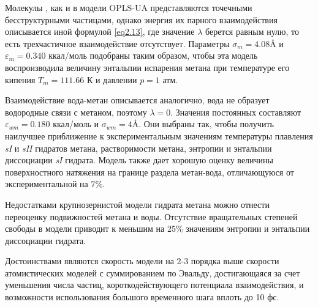 Молекулы , как и в модели OPLS-UA представляются точечными бесструктурными частицами, однако энергия их парного взаимодействия описывается иной формулой \eqref{eq2.13}, где значение $\lambda$ берется равным нулю, то есть трехчастичное взаимодействие отсутствует. Параметры $\sigma_m=4.08 \si{\angstrom}$ и  $\varepsilon_m=0.340$ ккал/моль подобраны таким образом, чтобы эта модель воспроизводила величину энтальпии испарения метана при температуре его кипения $T_m=111.66$ К и давлении $p=1$ атм.

Взаимодействие вода-метан описывается аналогично, вода не образует водородные связи с метаном, поэтому $\lambda=0$. Значения постоянных составляют $\varepsilon_{wm}=0.180$ ккал/моль  и $\sigma_{wm}=4 \si{\angstrom}$. Они выбраны так, чтобы получить наилучшее приближение к экспериментальным значениям температуры плавления \textit{sI} и \textit{sII} гидратов метана, растворимости метана, энтропии и энтальпии диссоциации \textit{sI} гидрата. Модель также дает хорошую оценку величины поверхностного натяжения на границе раздела метан-вода, отличающуюся от экспериментальной на 7\%. 

Недостатками крупнозернистой модели гидрата метана можно отнести переоценку подвижностей метана и воды. Отсутствие вращательных степеней свободы в модели приводит к меньшим на 25\% значениям энтропии и энтальпии диссоциации гидрата. 

Достоинствами являются скорость модели на 2-3 порядка выше скорости атомистических моделей с суммированием по Эвальду, достигающаяся за счет уменьшения числа частиц, короткодействующего потенциала взаимодействия, и возможности использования большого временного шага вплоть до 10 фс.

